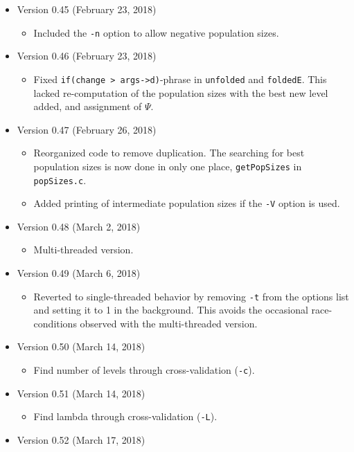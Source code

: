 \documentclass[a4paper]{article}
\newcommand{\ty}{\texttt}
\begin{document}
\begin{itemize}
\item Version 0.45 (February 23, 2018)
  \begin{itemize}
  \item Included the \ty{-n} option to allow negative population
    sizes.
  \end{itemize}
\item Version 0.46 (February 23, 2018)
  \begin{itemize}
    \item Fixed \ty{if(change > args->d)}-phrase in \ty{unfolded} and
      \ty{foldedE}. This lacked re-computation of the population sizes
      with the best new level added, and assignment of $\Psi$.
  \end{itemize}
\item Version 0.47 (February 26, 2018)
  \begin{itemize}
    \item Reorganized code to remove duplication. The searching for
      best population sizes is now done in only one place,
      \ty{getPopSizes} in \ty{popSizes.c}.
    \item Added printing of intermediate population sizes if the
      \ty{-V} option is used.
  \end{itemize}
\item Version 0.48 (March 2, 2018)
  \begin{itemize}
  \item Multi-threaded version.
  \end{itemize}
\item Version 0.49 (March 6, 2018)
  \begin{itemize}
  \item Reverted to single-threaded behavior by removing \ty{-t} from
    the options list and setting it to 1 in the background. This avoids the occasional
    race-conditions observed with the multi-threaded version.
  \end{itemize}
\item Version 0.50 (March 14, 2018)
  \begin{itemize}
  \item Find number of levels through cross-validation (\ty{-c}).
  \end{itemize}
\item Version 0.51 (March 14, 2018)
  \begin{itemize}
  \item Find lambda through cross-validation (\ty{-L}).
  \end{itemize}
\item Version 0.52 (March 17, 2018)

\end{itemize}
\end{document}
